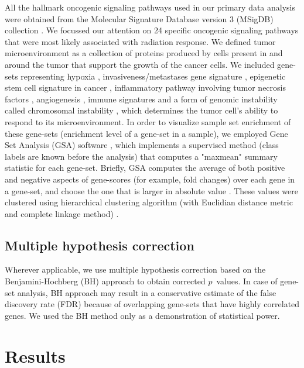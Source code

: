 \documentclass[hidelinks,11pt]{article}
\begin{document}
All the hallmark oncogenic signaling pathways used in our primary data analysis were obtained from the Molecular Signature Database version 3 (MSigDB) collection \cite{}. We focussed our attention on 24 specific oncogenic signaling pathways that were most likely associated with radiation response. We defined tumor microenvironment as a collection of proteins produced by cells present in and around the tumor that support the growth of the cancer cells. We included gene-sets representing hypoxia \cite{hypoxia}, invasiveness/metastases gene signature \cite{IGS}, epigenetic stem cell signature in cancer \cite{epigen}, inflammatory pathway involving tumor necrosis factors \cite{TNF}, angiogenesis \cite{WH}, immune signatures \cite{immune} and a form of genomic instability called chromosomal instability \cite{CIN}, which determines the tumor cell's ability to respond to its microenvironment. In order to visualize sample set enrichment of these gene-sets (enrichment level of a gene-set in a sample), we employed Gene Set Analysis (GSA) software \cite{gsa_software}, which implements a supervised method (class labels are known before the analysis) that computes a "maxmean" summary statistic for each gene-set. Briefly, GSA computes the average of both positive and negative aspects of gene-scores (for example, fold changes) over each gene in a gene-set, and choose the one that is larger in absolute value \cite{gsa}. These values were clustered using hierarchical clustering algorithm (with Euclidian distance metric and complete linkage method) \cite{clustering}. 

\subsection*{Multiple hypothesis correction}

Wherever applicable, we use multiple hypothesis correction based on the Benjamini-Hochberg (BH) approach \cite{BH} to obtain corrected $p$~values. In case of gene-set analysis, BH approach may result in a conservative estimate of the false discovery rate (FDR) because of overlapping gene-sets that have highly correlated genes. We used the BH method only as a demonstration of statistical power. 

\section*{Results}
\end{document}
